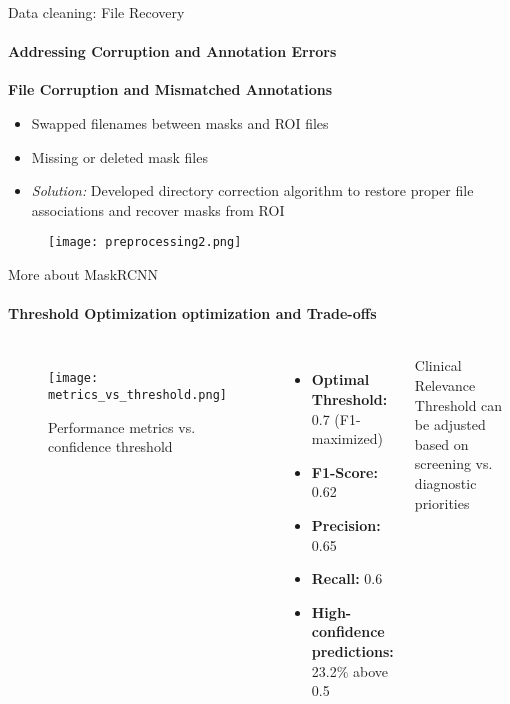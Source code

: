 \begin{frame}{Data cleaning: File Recovery}
    \framesubtitle{Addressing Corruption and Annotation Errors}
    
    
        \vspace{0.2cm}
        
        \textbf{File Corruption and Mismatched Annotations}
            \begin{itemize}
                \item Swapped filenames between masks and ROI files
                \item Missing or deleted mask files
                \item \textit{Solution:} Developed directory correction algorithm to restore proper file associations and recover masks from ROI
            \end{itemize}
        
        \vspace{0.2cm}
        \begin{figure}
            \centering
            \texttt{[image: preprocessing2.png]}
        \end{figure}
    
\end{frame}


\begin{frame}{More about MaskRCNN}
\framesubtitle{Threshold Optimization optimization and Trade-offs}
    \begin{columns}
        \begin{figure}
            \centering
            \texttt{[image: metrics\_vs\_threshold.png]}
            \caption{Performance metrics vs. confidence threshold}
        \end{figure}
        
                \begin{itemize}
            \item \textbf{Optimal Threshold:} 0.7 (F1-maximized)
            \item \textbf{F1-Score:} 0.62
            \item \textbf{Precision:} 0.65
            \item \textbf{Recall:} 0.6
            \item \textbf{High-confidence predictions:} 23.2\% above 0.5
        \end{itemize}
        
        \vspace{0.5cm}
        \begin{block}{Clinical Relevance}
            Threshold can be adjusted based on screening vs. diagnostic priorities
        \end{block}
    \end{columns}
\end{frame}

